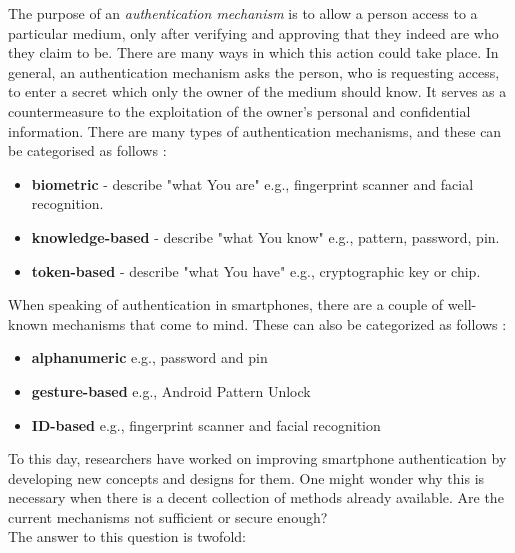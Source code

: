 The purpose of an \textit{authentication mechanism} is to allow a person access to a particular medium, only after verifying and approving that they indeed are who they claim to be. There are many ways in which this action could take place. In general, an authentication mechanism asks the person, who is requesting access, to enter a secret which only the owner of the medium should know. It serves as a countermeasure to the exploitation of the owner's personal and confidential information. There are many types of authentication mechanisms, and these can be categorised as follows \cite{gorman}: 
\begin{itemize}
    \item \textbf{biometric} - describe "what You are" e.g., fingerprint scanner and facial recognition.
    \item \textbf{knowledge-based} - describe "what You know" e.g., pattern, password, pin.
    \item \textbf{token-based} - describe "what You have" e.g., cryptographic key or chip.
\end{itemize}

When speaking of authentication in smartphones, there are a couple of well-known mechanisms that come to mind. These can also be categorized as follows \cite{ediss20251,gorman} : 
\begin{itemize}
    \item \textbf{alphanumeric} e.g., password and pin
    \item \textbf{gesture-based} e.g., Android Pattern Unlock
    \item \textbf{ID-based} e.g., fingerprint scanner and facial recognition 
\end{itemize}

To this day, researchers have worked on improving smartphone authentication by developing new concepts and designs for them. One might wonder why this is necessary when there is a decent collection of methods already available. Are the current mechanisms not sufficient or secure enough? \\

The answer to this question is twofold:\\

